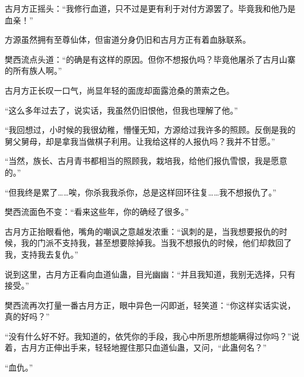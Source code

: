 \begin{this_body}
古月方正摇头：“我修行血道，只不过是更有利于对付方源罢了。毕竟我和他乃是血亲！”

方源虽然拥有至尊仙体，但宙道分身仍旧和古月方正有着血脉联系。

樊西流点头道：“的确是有这样的原因。但你不想报仇吗？毕竟他屠杀了古月山寨的所有族人啊。”

古月方正长叹一口气，尚显年轻的面庞却面露沧桑的萧索之色。

“这么多年过去了，说实话，我虽然仍旧恨他，但我也理解了他。”

“我回想过，小时候的我很幼稚，懵懂无知，方源给过我许多的照顾。反倒是我的舅父舅母，却是拿我当做棋子利用。让我给这样的人报仇吗？我并不甘愿。”

“当然，族长、古月青书都相当的照顾我，栽培我，给他们报仇雪恨，我是愿意的。”

“但我终是累了……唉，你杀我我杀你，总是这样回环往复……我不想报仇了。”

樊西流面色不变：“看来这些年，你的确经了很多。”

古月方正抬眼看他，嘴角的嘲讽之意越发浓重：“讽刺的是，当我想要报仇的时候，我的门派不支持我，甚至想要除掉我。当我不想报仇的时候，他们却救回了我，支持我去复仇。”

说到这里，古月方正看向血道仙蛊，目光幽幽：“并且我知道，我别无选择，只有接受。”

樊西流再次打量一番古月方正，眼中异色一闪即逝，轻笑道：“你这样实话实说，真的好吗？”

“没有什么好不好。我知道的，依凭你的手段，我心中所思所想能瞒得过你吗？”说着，古月方正伸出手来，轻轻地握住那只血道仙蛊，又问，“此蛊何名？”

“血仇。”

\end{this_body}

